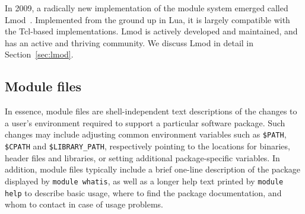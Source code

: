 In 2009, a radically new implementation of the module system emerged called
Lmod~\cite{taccLmod}. Implemented from the ground up in
Lua, it is largely compatible with the Tcl-based
implementations.  Lmod is actively developed and maintained, and has
an active and thriving community. We discuss Lmod in detail in
Section~\ref{sec:lmod}.


%
%

\subsection{Module files}
\label{sec:Module_files}

In essence, module files are shell-independent text descriptions of
the changes to a user's environment required to support a
particular software package. Such changes may include adjusting common environment variables such as \texttt{\small \$PATH},
\texttt{\small \$CPATH} and \texttt{\small \$LIBRARY\_PATH}, respectively pointing
to the locations for binaries, header files and libraries, or setting additional
package-specific variables. In addition,
module files typically include a brief one-line description of the
package displayed by \texttt{\small module whatis}, as well as a longer help
text printed by \texttt{\small module help} to describe basic usage,
where to find the package documentation, and whom to contact in case
of usage problems.

